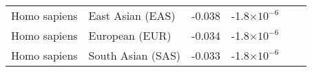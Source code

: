 \documentclass{article}
\begin{document}
\begin{table*}[!ht]
\begin{adjustbox}{width = 1\textwidth}
\begin{tabular}{|l|l|r|r|r|r|}
                Homo sapiens        & East Asian (EAS)               & -0.038                & -1.8$\times 10^{-6}$                 \\
                Homo sapiens        & European (EUR)                 & -0.034                & -1.8$\times 10^{-6}$                 \\
                Homo sapiens        & South Asian (SAS)              & -0.033                & -1.8$\times 10^{-6}$                 \\
                \bottomrule
            \end{tabular}
        \end{adjustbox}
    \end{table*}

\end{document}

